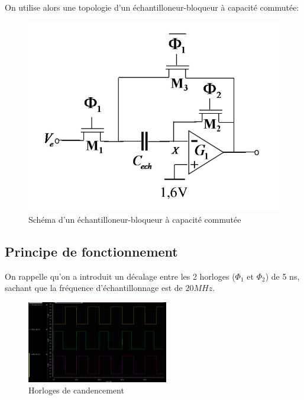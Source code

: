 \documentclass[11pt]{article}
\begin{document}
On utilise alors une topologie d'un \'echantilloneur-bloqueur \`a capacit\'e commut\'ee:

\begin{figure}[!htb]
\begin{center}
  \includegraphics[scale=0.30]{Echantillonneur-bloqueur.jpg}
  \caption{Sch\'ema d'un \'echantilloneur-bloqueur \`a capacit\'e commut\'ee}
\end{center}
\end{figure}

\subsection{Principe de fonctionnement}

On rappelle qu'on a introduit un d\'ecalage entre les 2 horloges ($\Phi_1$ et $\Phi_2$) de 5 ns, sachant que la
fr\'equence d'\'echantillonnage est de $20 MHz$.

\begin{figure}
\begin{center}
  \includegraphics[width=0.55\textwidth]{clocks_.png}
\end{center}
\caption{Horloges de candencement}
\end{figure}
\end{document}
